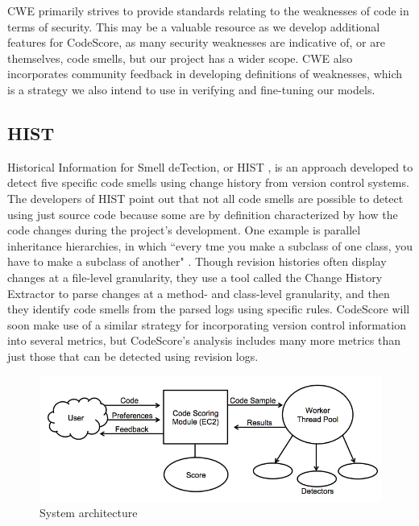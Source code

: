 \documentclass{sig-alternate}
\begin{document}
CWE primarily strives to provide standards relating to the weaknesses of code in
terms of security. This may be a valuable resource as we develop additional features for
CodeScore, as many security weaknesses are indicative of, or are themselves, code 
smells, but our project has a wider scope. CWE also incorporates community feedback in
developing definitions of weaknesses, which is a strategy we also intend to use
in verifying and fine-tuning our models.

\subsection{HIST}
Historical Information for Smell deTection, or HIST \cite{palomba}, is an
approach developed to detect five specific code smells using change history from
version control systems.  The developers of HIST point out that not all code
smells are possible to detect using just source code because some are by
definition characterized by how the code changes during the project's
development. One example is parallel inheritance hierarchies, in which ``every
tme you make a subclass of one class, you have to make a subclass of another"
\cite{fowler1999}. Though revision histories often display changes at a
file-level granularity, they use a tool called the Change History Extractor to parse
changes at a method- and class-level granularity, and then they identify code 
smells from the parsed logs using specific rules. CodeScore will soon
make use of a similar strategy for incorporating version control information
into several metrics, but CodeScore's analysis includes many more metrics than just
those that can be detected using revision logs.

\begin{figure}[ht]
	\begin{center}
		\includegraphics[width=0.9\linewidth]{block_diagram}
	\end{center}
	\vspace{-12pt}
	\caption{System architecture}
	\label{fig:some_graph}
\end{figure}
\end{document}
